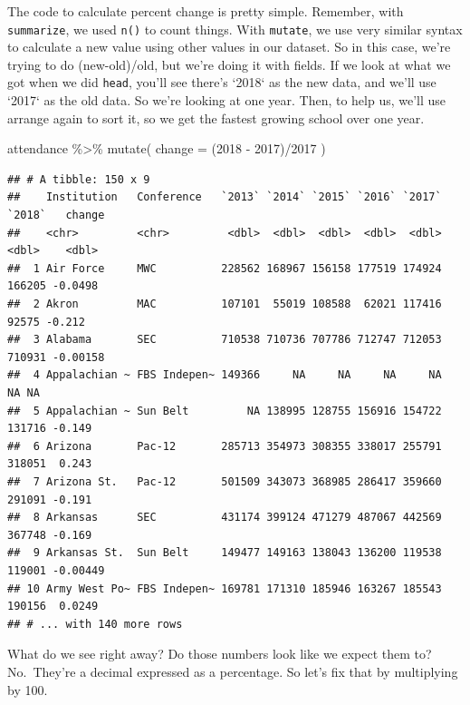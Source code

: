 \documentclass[
]{book}
\newenvironment{Shaded}{\begin{snugshade}}{\end{snugshade}}
\newcommand{\AttributeTok}[1]{\textcolor[rgb]{0.77,0.63,0.00}{#1}}
\newcommand{\FunctionTok}[1]{\textcolor[rgb]{0.00,0.00,0.00}{#1}}
\newcommand{\NormalTok}[1]{#1}
\newcommand{\SpecialCharTok}[1]{\textcolor[rgb]{0.00,0.00,0.00}{#1}}
\newcommand{\StringTok}[1]{\textcolor[rgb]{0.31,0.60,0.02}{#1}}
\begin{document}
The code to calculate percent change is pretty simple. Remember, with \texttt{summarize}, we used \texttt{n()} to count things. With \texttt{mutate}, we use very similar syntax to calculate a new value using other values in our dataset. So in this case, we're trying to do (new-old)/old, but we're doing it with fields. If we look at what we got when we did \texttt{head}, you'll see there's `2018` as the new data, and we'll use `2017` as the old data. So we're looking at one year. Then, to help us, we'll use arrange again to sort it, so we get the fastest growing school over one year.

\begin{Shaded}
\begin{Highlighting}[]
\NormalTok{attendance }\SpecialCharTok{\%\textgreater{}\%} \FunctionTok{mutate}\NormalTok{(}
  \AttributeTok{change =}\NormalTok{ (}\StringTok{\textasciigrave{}}\AttributeTok{2018}\StringTok{\textasciigrave{}} \SpecialCharTok{{-}} \StringTok{\textasciigrave{}}\AttributeTok{2017}\StringTok{\textasciigrave{}}\NormalTok{)}\SpecialCharTok{/}\StringTok{\textasciigrave{}}\AttributeTok{2017}\StringTok{\textasciigrave{}}
\NormalTok{) }
\end{Highlighting}
\end{Shaded}

\begin{verbatim}
## # A tibble: 150 x 9
##    Institution   Conference   `2013` `2014` `2015` `2016` `2017` `2018`   change
##    <chr>         <chr>         <dbl>  <dbl>  <dbl>  <dbl>  <dbl>  <dbl>    <dbl>
##  1 Air Force     MWC          228562 168967 156158 177519 174924 166205 -0.0498 
##  2 Akron         MAC          107101  55019 108588  62021 117416  92575 -0.212  
##  3 Alabama       SEC          710538 710736 707786 712747 712053 710931 -0.00158
##  4 Appalachian ~ FBS Indepen~ 149366     NA     NA     NA     NA     NA NA      
##  5 Appalachian ~ Sun Belt         NA 138995 128755 156916 154722 131716 -0.149  
##  6 Arizona       Pac-12       285713 354973 308355 338017 255791 318051  0.243  
##  7 Arizona St.   Pac-12       501509 343073 368985 286417 359660 291091 -0.191  
##  8 Arkansas      SEC          431174 399124 471279 487067 442569 367748 -0.169  
##  9 Arkansas St.  Sun Belt     149477 149163 138043 136200 119538 119001 -0.00449
## 10 Army West Po~ FBS Indepen~ 169781 171310 185946 163267 185543 190156  0.0249 
## # ... with 140 more rows
\end{verbatim}

What do we see right away? Do those numbers look like we expect them to? No.~They're a decimal expressed as a percentage. So let's fix that by multiplying by 100.
\end{document}
